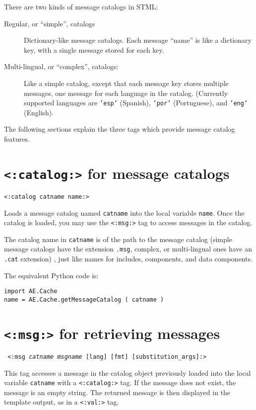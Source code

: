 \documentclass{manual}
\begin{document}
{{There are two kinds of message catalogs in STML:

\begin{description}
\item[Regular, or ``simple'', catalogs] Dictionary-like
message catalogs. Each message ``name'' is like a dictionary
key, with a single message stored for each key.

\item[Multi-lingual, or ``complex'', catalogs:] Like a
simple catalog, except that each message key stores
multiple messages, one message for each language in the
catalog. (Currently supported languages are \texttt{'esp'} (Spanish),
\texttt{'por'} (Portuguese), and \texttt{'eng'} (English). 
\end{description}

The following sections explain the three tags which
provide message catalog features.


\section{\texttt{<:catalog:>} for message catalogs}
\label{tagcatalog}

\texttt{<:catalog catname name:>}

Loads a  message catalog 
named \texttt{catname} into the local variable 
\texttt{name}. Once the catalog is loaded, you may
use the \texttt{<:msg:>} 
tag to access messages in the catalog.

The catalog name in \texttt{catname} is of the path to the message
catalog (simple message catalogs have the extension \texttt{.msg}, complex, or multi-lingual ones have an \texttt{.cat} extension)
, just like names for includes,
components, and data components.

The equivalent Python code is:
\begin{verbatim}
import AE.Cache
name = AE.Cache.getMessageCatalog ( catname )
\end{verbatim}


\section{\texttt{<:msg:>} for retrieving messages}
\label{tagmsg}

\texttt{
<:msg \emph{catname msgname} [lang] 
    [fmt] [substitution_args]:>
}

This tag accesses a message in the catalog object
previously loaded into the local variable \texttt{catname}
with a \texttt{<:catalog:>}
tag. If the message does not
exist, the message is an empty string. The returned message
is then displayed in the template output, as in a
\texttt{<:val:>}  tag.

}}
\end{document}
